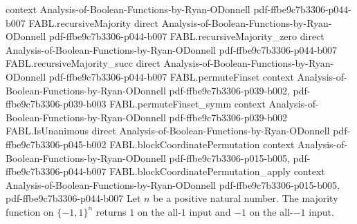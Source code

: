\begin{theorem}
  {context}
  {Analysis-of-Boolean-Functions-by-Ryan-ODonnell}
  {pdf-ffbe9c7b3306-p044-b007}
\proofstep
  {FABL.recursiveMajority}
  {direct}
  {Analysis-of-Boolean-Functions-by-Ryan-ODonnell}
  {pdf-ffbe9c7b3306-p044-b007}
\proofstep
  {FABL.recursiveMajority_zero}
  {direct}
  {Analysis-of-Boolean-Functions-by-Ryan-ODonnell}
  {pdf-ffbe9c7b3306-p044-b007}
\proofstep
  {FABL.recursiveMajority_succ}
  {direct}
  {Analysis-of-Boolean-Functions-by-Ryan-ODonnell}
  {pdf-ffbe9c7b3306-p044-b007}
\proofstep
  {FABL.permuteFinset}
  {context}
  {Analysis-of-Boolean-Functions-by-Ryan-ODonnell}
  {pdf-ffbe9c7b3306-p039-b002,
    pdf-ffbe9c7b3306-p039-b003}
\proofstep
  {FABL.permuteFinset_symm}
  {context}
  {Analysis-of-Boolean-Functions-by-Ryan-ODonnell}
  {pdf-ffbe9c7b3306-p039-b002}
\proofstep
  {FABL.IsUnanimous}
  {direct}
  {Analysis-of-Boolean-Functions-by-Ryan-ODonnell}
  {pdf-ffbe9c7b3306-p045-b002}
\proofstep
  {FABL.blockCoordinatePermutation}
  {context}
  {Analysis-of-Boolean-Functions-by-Ryan-ODonnell}
  {pdf-ffbe9c7b3306-p015-b005,
    pdf-ffbe9c7b3306-p044-b007}
\proofstep
  {FABL.blockCoordinatePermutation_apply}
  {context}
  {Analysis-of-Boolean-Functions-by-Ryan-ODonnell}
  {pdf-ffbe9c7b3306-p015-b005,
    pdf-ffbe9c7b3306-p044-b007}
Let $n$ be a positive natural number. The majority function on $\{-1,1\}^n$ returns
$1$ on the all-$1$ input and $-1$ on the all-$-1$ input.
\end{theorem}

